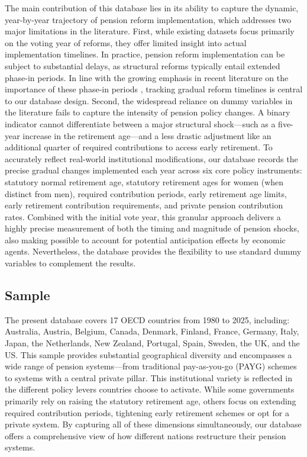 \documentclass[11pt,english,a4paper, twoside, authoryear]{article}
\begin{document}
The main contribution of this database lies in its ability to capture the dynamic, year-by-year trajectory of pension reform implementation, which addresses two major limitations in the literature.
First, while existing datasets focus primarily on the voting year of reforms, they offer limited insight into actual implementation timelines. In practice, pension reform implementation can be subject to substantial delays, as structural reforms typically entail extended phase-in periods. In line with the growing emphasis in recent literature on the importance of these phase-in periods \citep{BiZubairy2023, romp_political_2024}, tracking gradual reform timelines is central to our database design.
Second, the widespread reliance on dummy variables in the literature fails to capture the intensity of pension policy changes. A binary indicator cannot differentiate between a major structural shock—such as a five-year increase in the retirement age—and a less drastic adjustment like an additional quarter of required contributions to access early retirement. To accurately reflect real-world institutional modifications, our database records the precise gradual changes implemented each year across six core policy instruments: statutory normal retirement age, statutory retirement ages for women  (when distinct from men), required contribution periods, early retirement age limits, early retirement contribution requirements, and private pension contribution rates. Combined with the initial vote year, this granular approach delivers a highly precise measurement of both the timing and magnitude of pension shocks, also making possible to account for potential anticipation effects by economic agents. Nevertheless, the database provides the flexibility to use standard dummy variables to complement the results.


\subsection{Sample}
The present database covers 17 OECD countries from 1980 to 2025, including: Australia, Austria, Belgium, Canada, Denmark, Finland, France, Germany, Italy, Japan, the Netherlands, New Zealand, Portugal, Spain, Sweden, the UK, and the US. This sample provides substantial geographical diversity and encompasses a wide range of pension systems—from traditional pay-as-you-go (PAYG) schemes to systems with a central private pillar. This institutional variety is reflected in the different policy levers countries choose to activate. While some governments primarily rely on raising the statutory retirement age, others focus on extending required contribution periods, tightening early retirement schemes or opt for a private system. By capturing all of these dimensions simultaneously, our database offers a comprehensive view of how different nations restructure their pension systems.
\end{document}

